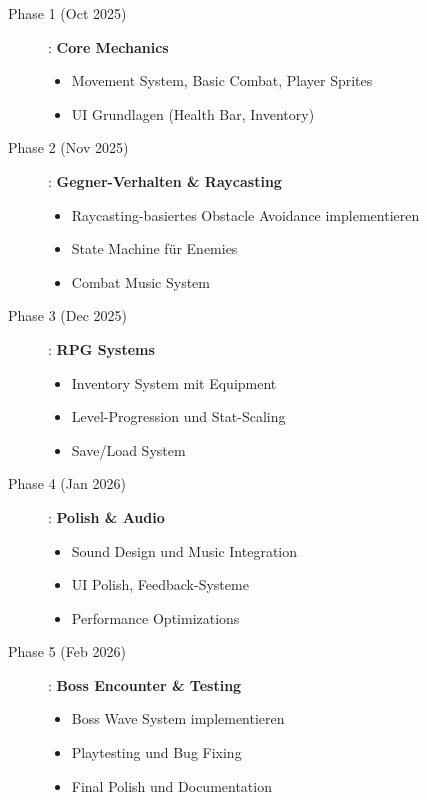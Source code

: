 \documentclass[
  a4paper,
  11pt,
  ngerman,
  parskip=half,
  bibliography=totoc,
  listof=totoc
]{scrreprt}
\begin{document}
\begin{description}
    \item[Phase 1 (Oct 2025)]: \textbf{Core Mechanics}
    \begin{itemize}
        \item Movement System, Basic Combat, Player Sprites
        \item UI Grundlagen (Health Bar, Inventory)
    \end{itemize}

    \item[Phase 2 (Nov 2025)]: \textbf{Gegner-Verhalten \& Raycasting}
    \begin{itemize}
        \item Raycasting-basiertes Obstacle Avoidance implementieren
        \item State Machine für Enemies
        \item Combat Music System
    \end{itemize}

    \item[Phase 3 (Dec 2025)]: \textbf{RPG Systems}
    \begin{itemize}
        \item Inventory System mit Equipment
        \item Level-Progression und Stat-Scaling
        \item Save/Load System
    \end{itemize}

    \item[Phase 4 (Jan 2026)]: \textbf{Polish \& Audio}
    \begin{itemize}
        \item Sound Design und Music Integration
        \item UI Polish, Feedback-Systeme
        \item Performance Optimizations
    \end{itemize}

    \item[Phase 5 (Feb 2026)]: \textbf{Boss Encounter \& Testing}
    \begin{itemize}
        \item Boss Wave System implementieren
        \item Playtesting und Bug Fixing
        \item Final Polish und Documentation
    \end{itemize}
\end{description}
\end{document}
